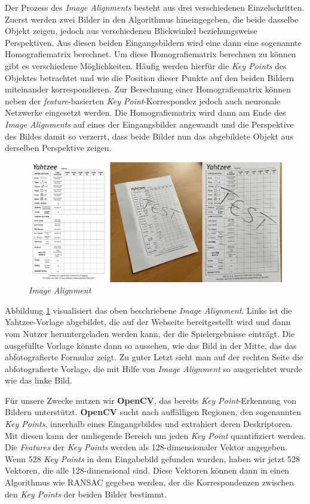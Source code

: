Der Prozess des \textit{Image Alignments} besteht aus drei verschiedenen Einzelschritten.
Zuerst werden zwei Bilder in den Algorithmus hineingegeben, die beide dasselbe Objekt zeigen, jedoch aus verschiedenen Blickwinkel beziehungsweise Perspektiven. 
Aus diesen beiden Eingangsbildern wird eine dann eine sogenannte Homografiematrix berechnet. Um diese Homografiematrix berechnen zu können gibt es verschiedene
Möglichkeiten. Häufig werden hierfür die \textit{Key Points} des Objektes betrachtet und wie die Position dieser Punkte auf den beiden Bildern miteinander korrespondieren. 
Zur Berechnung einer Homografiematrix können neben der \textit{feature}-basierten \textit{Key Point}-Korrespondez jedoch auch neuronale Netzwerke eingesetzt werden. 
Die Homografiematrix wird dann am Ende des \textit{Image Alignments} auf eines der Eingangsbilder angewandt und die Perspektive des Bildes damit so verzerrt, 
dass beide Bilder nun das abgebildete Objekt aus derselben Perspektive zeigen.\cite{rosebrock}

\begin{figure}[H]
	\centering
	\includegraphics[width=\imgMed]{images/practice/image_alignment.jpg}
	\caption{\textit{Image Alignment}} 
	\label{fig:image_alignment}
\end{figure}

Abbildung \ref{fig:image_alignment} visualisiert das oben beschriebene \textit{Image Alignment}. Links ist die Yahtzee-Vorlage abgebildet, die auf der Webseite 
bereitgestellt wird und dann vom Nutzer heruntergeladen werden kann, der die Spielergebnisse einträgt. Die ausgefüllte Vorlage könnte dann so aussehen, wie das 
Bild in der Mitte, das das abfotografierte Formular zeigt. Zu guter Letzt sieht man auf der rechten Seite die abfotografierte Vorlage, die mit Hilfe von 
\textit{Image Alignment} so ausgerichtet wurde wie das linke Bild.

Für unsere Zwecke nutzen wir \textbf{OpenCV}, das bereits \textit{Key Point}-Erkennung von Bildern unterstützt. \textbf{OpenCV} sucht nach auffälligen Regionen,
den sogenannten \textit{Key Points}, innerhalb eines Eingangsbildes und extrahiert deren Deskriptoren. Mit diesen kann der umliegende Bereich um jeden 
\textit{Key Point} quantifiziert werden. Die \textit{Features} der \textit{Key Points} werden als 128-dimensionaler Vektor angegeben. Wenn 528 \textit{Key Points}
in dem Eingabebild gefunden wurden, haben wir jetzt 528 Vektoren, die alle 128-dimensional sind. Diese Vektoren können dann in einen Algorithmus wie RANSAC gegeben
werden, der die Korrespondenzen zwischen den \textit{Key Points} der beiden Bilder bestimmt.

